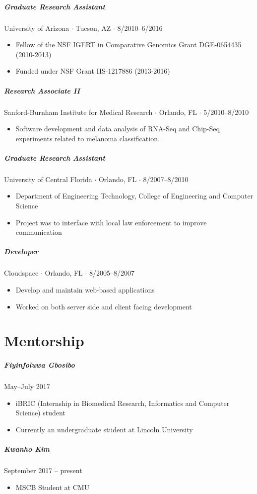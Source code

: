 \documentclass[10pt,letterpaper]{article}
\newcommand{\bigdot}{$\cdot$\xspace}
\begin{document}
\subparagraph{Graduate Research Assistant}
University of Arizona \bigdot Tucson, AZ \bigdot 8/2010--6/2016 
\begin{itemize}
    \item Fellow of the NSF IGERT in Comparative Genomics Grant DGE-0654435 (2010-2013)
    \item Funded under NSF Grant IIS-1217886 (2013-2016)
\end{itemize}

\subparagraph{Research Associate II}
Sanford-Burnham Institute for Medical Research \bigdot Orlando, FL \bigdot 5/2010--8/2010 
\begin{itemize}
    \item Software development and data analysis of RNA-Seq and Chip-Seq experiments related to melanoma classification.
\end{itemize}

\subparagraph{Graduate Research Assistant}
University of Central Florida \bigdot Orlando, FL \bigdot 8/2007--8/2010 
\begin{itemize}
    \item Department of Engineering Technology, College of Engineering and Computer Science
    \item Project was to interface with local law enforcement to improve communication
\end{itemize}

\subparagraph{Developer}
Cloudspace \bigdot Orlando, FL \bigdot 8/2005--8/2007 
\begin{itemize}
    \item Develop and maintain web-based applications 
    \item Worked on both server side and client facing development
\end{itemize}

\section*{Mentorship}
\subparagraph{Fiyinfoluwa Gbosibo} May--July 2017
\begin{itemize}
\item iBRIC (Internship in Biomedical Research, Informatics and Computer Science) student
\item Currently an undergraduate student at Lincoln University
\end{itemize}

\subparagraph{Kwanho Kim} September 2017 -- present
\begin{itemize}
\item MSCB Student at CMU
\end{itemize}
\end{document}
